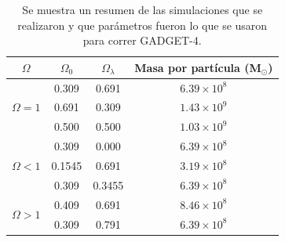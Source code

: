 \documentclass{beamer}
\begin{document}

	\begin{frame}
		\begin{table}[H]
			\centering
			\begin{tabular}{|c|c|c|c|}
			
				\hline
				$\Omega$ & $\Omega_0$ & $\Omega_\lambda$ & Masa por partícula (M$_\odot$) \\ \hline
				\multirow{3}{*}{$\Omega = 1$} & 0.309 & 0.691 & $6.39 \times 10^8$ \\ \cline{2-4} 
				 & 0.691 & 0.309 & $1.43 \times 10^9$ \\ \cline{2-4} 
				 & 0.500 & 0.500 & $1.03 \times 10^9$ \\ \hline
				\multirow{3}{*}{$\Omega < 1$} & 0.309 & 0.000 & $6.39 \times 10^8$ \\ \cline{2-4} 
				 & 0.1545 & 0.691 & $3.19 \times 10^8$ \\ \cline{2-4} 
				 & 0.309 & 0.3455 & $6.39 \times 10^8$ \\ \hline
				\multirow{2}{*}{$\Omega > 1$} & 0.409 & 0.691 & $8.46 \times 10^8$ \\ \cline{2-4} 
				 & 0.309 & 0.791 & $6.39 \times 10^8$ \\ \hline
			
			\end{tabular}
			
			\caption{Se muestra un resumen de las simulaciones que se realizaron y que parámetros fueron lo que se usaron para correr GADGET-4. }
			
			\label{tab:Resumen_Sim}
		
		\end{table}
	\end{frame}
\end{document}

